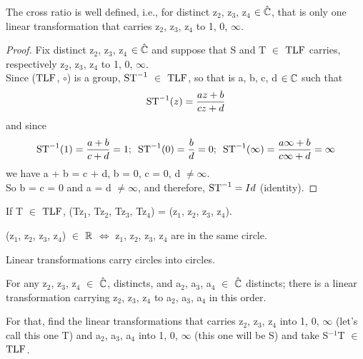 \begin{fato}
The cross ratio is well defined, i.e., for distinct z$_2$, z$_3$, z$_4$ $\in \hat{\mathbb{C}}$, that is only one linear transformation that carries z$_2$, z$_3$, z$_4$ to 1, 0, $\infty$.
\end{fato}

\begin{proof}
Fix distinct z$_2$, z$_3$, z$_4$ $\in \hat{\mathbb{C}}$ and suppose that S and T $\in$ $\operatorname{TLF}$ carries, respectively z$_2$, z$_3$, z$_4$ to 1, 0, $\infty$.\\
Since ($\operatorname{TLF}$, $\circ$) is a group, $\operatorname{ST}^{-1}$ $\in$ $\operatorname{TLF}$, so that is a, b, c, d $\in \mathbb{C}$ such that
\begin{equation*}
    \operatorname{ST}^{-1}(z) = \frac{az+b}{cz+d}
\end{equation*}
 and since 
 \begin{equation*}
    \operatorname{ST}^{-1}(1) = \frac{a+b}{c+d} = 1;\text{ } \operatorname{ST}^{-1}(0) = \frac{b}{d} = 0;\text{ } \operatorname{ST}^{-1}(\infty) = \frac{a\infty+b}{c\infty+d} = \infty
 \end{equation*}
we have a + b = c + d, b = 0, c = 0, d $\neq \infty$.\\ 
So b = c = 0 and a = d $\neq \infty$, and therefore, $\operatorname{ST}^{-1} = Id$ (identity).
\end{proof}

\begin{teorema}
If T $\in$ $\operatorname{TLF}$, (Tz$_1$, Tz$_2$, Tz$_3$, Tz$_4$) = (z$_1$, z$_2$, z$_3$, z$_4$).
\end{teorema}

\begin{teorema}
(z$_1$, z$_2$, z$_3$, z$_4$) $\in$ $\mathbb{R}$ $\Leftrightarrow$ z$_1$, z$_2$, z$_3$, z$_4$ are in the same circle.
\end{teorema}

\begin{corolario}
Linear transformations carry circles into circles.
\end{corolario}

\begin{fato}
For any z$_2$, z$_3$, z$_4$ $\in$ $\hat{\mathbb{C}}$, distincts, and a$_2$, a$_3$, a$_4$ $\in$ $\hat{\mathbb{C}}$ distincts; there is a linear transformation carrying z$_2$, z$_3$, z$_4$ to a$_2$, a$_3$, a$_4$ in this order.

For that, find the linear transformations that carries z$_2$, z$_3$, z$_4$ into 1, 0, $\infty$ (let's call this one T) and a$_2$, a$_3$, a$_4$ into 1, 0, $\infty$ (this one will be S) and take S$^{-1}$T $\in$ $\operatorname{TLF}$.
\end{fato}

